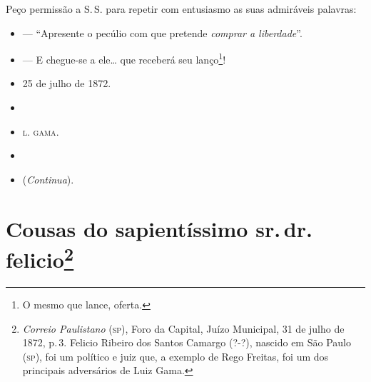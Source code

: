 Peço permissão a S.\,S. para repetir com entusiasmo as suas admiráveis
palavras:

\begin{itemize}
\item
  --- ``Apresente o pecúlio com que pretende \emph{comprar a liberdade}''.
\item
  --- E chegue-se a ele\ldots{} que receberá seu lanço\footnote{ O mesmo que
    lance, oferta.}!
\item
  25 de julho de 1872.
\item
\item
 \textsc{l. gama}.
\item
\item
  (\emph{Continua}).
\end{itemize}

\chapter{Cousas do sapientíssimo sr.\,dr.\,felicio\footnote{\emph{Correio Paulistano} (\textsc{sp}), Foro da Capital, Juízo
  Municipal, 31 de julho de 1872, p.\,3. Felicio Ribeiro dos Santos Camargo (?-?),
  nascido em São Paulo (\textsc{sp}), foi um político e juiz que, a exemplo de
  Rego Freitas, foi um dos principais adversários de Luiz Gama.}} %

